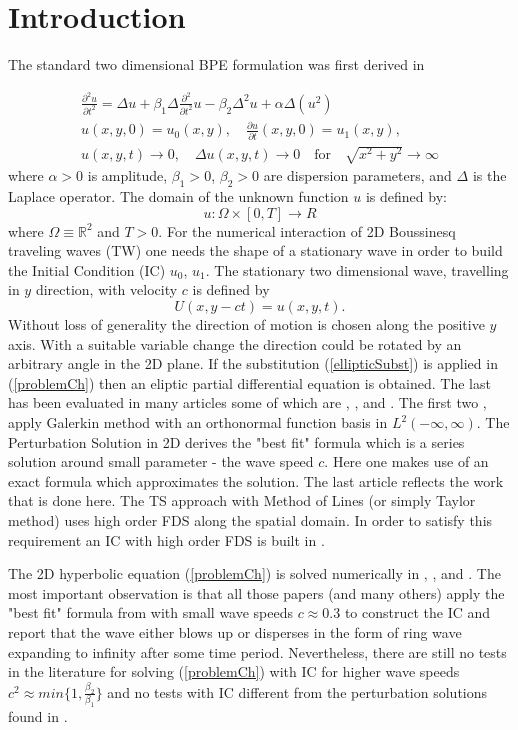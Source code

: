 \documentclass[%
 aip,
cp,  %
 amsmath,amssymb,%
 reprint,%
]{revtex4-2}
\newcommand{\be}{\begin{equation}}
\newcommand{\ee}{\end{equation}}
\newcommand{\rf}[1]{(\ref{#1})}
\newcommand{\RR}{\mathbb{R}}
\begin{document}
\section{\label{sec:level1}Introduction}

The standard two dimensional BPE formulation was first derived in \cite{ref1}

\begin{align}\label{problemCh}
 \frac{\partial^2 u}{\partial t^2}= \Delta u + \beta_1 \Delta \frac{\partial^2}{\partial t^2} u -  \beta_2 \Delta^2 u +  \alpha \Delta (u^2)
\\
u(x,y,0) = u_0(x,y), \quad \frac{\partial u}{\partial t}(x,y,0)=u_1(x,y), \nonumber
\\
u(x,y,t) \rightarrow 0, \quad \Delta u(x,y, t) \rightarrow 0 \quad \text{for} \quad \sqrt{x^2+y^2} \rightarrow \infty \nonumber
\end{align}
where $\alpha>0$ is amplitude, $\beta_1>0$, $\beta_2>0$  are dispersion parameters, and $\Delta$ is the Laplace operator. The domain of the unknown function $u$ is defined by:
\be
 u:\Omega \times [0, T] \rightarrow R
\ee
where $\Omega \equiv \RR^2$ and $T>0$. For the numerical interaction of 2D Boussinesq traveling waves (TW) one needs the shape of a stationary wave in order to build the Initial Condition (IC) $u_0$, $u_1$. The stationary two dimensional wave, travelling in $y$ direction, with velocity $c$ is defined by
\be\label{ellipticSubst}
	U(x, y-ct) = u(x,y,t).
\ee
Without loss of generality the direction of motion is chosen along the positive $y$ axis. With a suitable variable change the direction could be rotated by an arbitrary angle in the 2D plane. If the substitution \rf{ellipticSubst} is applied in \rf{problemCh} then an eliptic partial differential equation is obtained. The last has been evaluated in many articles some of which are \cite{ref13}, \cite{ref14}, \cite{ref15} and \cite{ref16}. The first two \cite{ref13}, \cite{ref14} apply Galerkin method with an orthonormal function basis in $L^2(-\infty, \infty)$. The Perturbation Solution \cite{ref15} in 2D derives the "best fit" formula which is a series solution around small parameter - the wave speed $c$. Here one makes use of an exact formula which approximates the solution. The last article \cite{ref16} reflects the work that is done here. The TS approach with Method of Lines (or simply Taylor method) uses high order FDS along the spatial domain. In order to satisfy this requirement an IC with high order FDS is built in \cite{ref16}.

The 2D hyperbolic equation \rf{problemCh} is solved numerically in \cite{ref20}, \cite{ref21}, \cite{ref22} and \cite{ref23}. The most important observation is that all those papers (and many others) apply the "best fit" formula from \cite{ref15} with small wave speeds $c \approx 0.3$ to construct the IC and report that the wave either blows up or disperses in the form of ring wave expanding to infinity after some time period. Nevertheless, there are still no tests in the literature for solving \rf{problemCh} with IC for higher wave speeds $c^2 \approx min\{1, \frac{\beta_2}{\beta_1} \}$ and no tests with IC different from the perturbation solutions found in \cite{ref15}.
\end{document}
